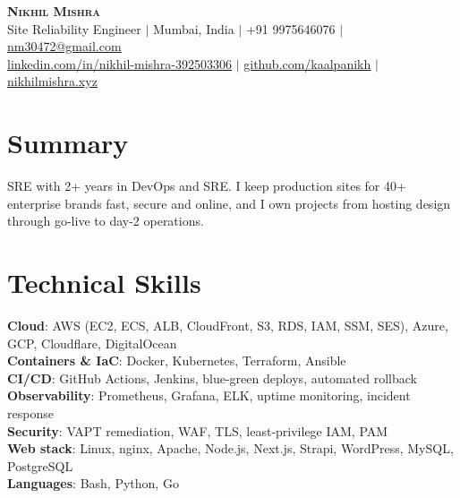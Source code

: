 \documentclass[a4paper,11pt]{article}
\begin{document}
\begin{center}
    \textbf{\Huge \scshape Nikhil Mishra} \\ \vspace{2pt}
    \small Site Reliability Engineer $|$ Mumbai, India $|$ +91 9975646076 $|$ \href{mailto:nm30472@gmail.com}{\underline{nm30472@gmail.com}} \\ \vspace{1pt}
    \small \href{https://www.linkedin.com/in/nikhil-mishra-392503306/}{\underline{linkedin.com/in/nikhil-mishra-392503306}} $|$
    \href{https://github.com/kaalpanikh}{\underline{github.com/kaalpanikh}} $|$
    \href{https://nikhilmishra.xyz}{\underline{nikhilmishra.xyz}}
\end{center}

\section{Summary}
\small{SRE with 2+ years in DevOps and SRE. I keep production sites for 40+ enterprise brands fast, secure and online, and I own projects from hosting design through go-live to day-2 operations.}

\section{Technical Skills}
 \begin{itemize}[leftmargin=0.15in, label={}]
    \small{\item{
     \textbf{Cloud}{: AWS (EC2, ECS, ALB, CloudFront, S3, RDS, IAM, SSM, SES), Azure, GCP, Cloudflare, DigitalOcean} \\
     \textbf{Containers \& IaC}{: Docker, Kubernetes, Terraform, Ansible} \\
     \textbf{CI/CD}{: GitHub Actions, Jenkins, blue-green deploys, automated rollback} \\
     \textbf{Observability}{: Prometheus, Grafana, ELK, uptime monitoring, incident response} \\
     \textbf{Security}{: VAPT remediation, WAF, TLS, least-privilege IAM, PAM} \\
     \textbf{Web stack}{: Linux, nginx, Apache, Node.js, Next.js, Strapi, WordPress, MySQL, PostgreSQL} \\
     \textbf{Languages}{: Bash, Python, Go}
    }}
 \end{itemize}

\end{document}
